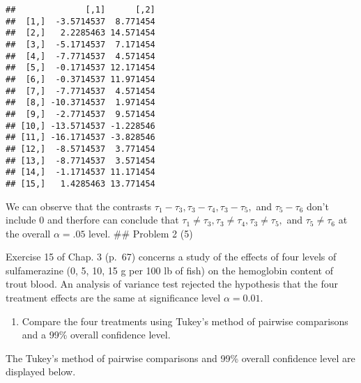 \documentclass[12pt,]{article}
\providecommand{\tightlist}{%
  \setlength{\itemsep}{0pt}\setlength{\parskip}{0pt}}
\begin{document}
\begin{verbatim}
##              [,1]      [,2]
##  [1,]  -3.5714537  8.771454
##  [2,]   2.2285463 14.571454
##  [3,]  -5.1714537  7.171454
##  [4,]  -7.7714537  4.571454
##  [5,]  -0.1714537 12.171454
##  [6,]  -0.3714537 11.971454
##  [7,]  -7.7714537  4.571454
##  [8,] -10.3714537  1.971454
##  [9,]  -2.7714537  9.571454
## [10,] -13.5714537 -1.228546
## [11,] -16.1714537 -3.828546
## [12,]  -8.5714537  3.771454
## [13,]  -8.7714537  3.571454
## [14,]  -1.1714537 11.171454
## [15,]   1.4285463 13.771454
\end{verbatim}

We can observe that the contrasts
\(\tau_1 - \tau_3, \tau_3 - \tau_4, \tau_3 - \tau_5,\) and
\(\tau_5 - \tau_6\) don't include 0 and therfore can conclude that
\(\tau_1 \neq \tau_3, \tau_3 \neq \tau_4, \tau_3 \neq \tau_5,\) and
\(\tau_5 \neq \tau_6\) at the overall \(\alpha=.05\) level. \#\# Problem
2 (5)

Exercise 15 of Chap. 3 (p.~67) concerns a study of the effects of four
levels of sulfamerazine (0, 5, 10, 15 g per 100 lb of fish) on the
hemoglobin content of trout blood. An analysis of variance test rejected
the hypothesis that the four treatment effects are the same at
significance level \(\alpha=0.01\).

\begin{enumerate}
\def\labelenumi{(\alph{enumi})}
\tightlist
\item
  Compare the four treatments using Tukey's method of pairwise
  comparisons and a 99\% overall confidence level.
\end{enumerate}

The Tukey's method of pairwise comparisons and 99\% overall confidence
level are displayed below.
\end{document}
